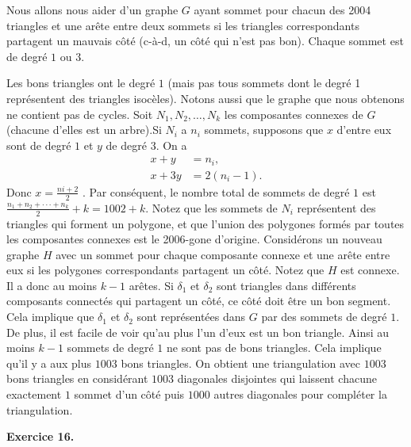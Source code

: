  
\begin{sol}

Nous allons nous aider d’un graphe $G$ ayant sommet pour chacun des 2004 triangles et une arête entre deux sommets si les triangles correspondants partagent un mauvais côté (c-à-d, un côté qui n’est pas bon). 
Chaque sommet est de degré $1$ ou $3$. 

Les bons triangles ont le degré $1$ (mais pas tous sommets dont le degré 1 représentent des triangles isocèles). Notons aussi que le graphe que nous obtenons ne contient pas de cycles.
Soit $N_1,N_2,\ldots, N_k$ les composantes connexes de $G$ (chacune d'elles est un arbre).Si $N_i $ a $n_i$ sommets, supposons que $x$ d’entre eux sont de degré $1$ et $y$ de degré $3$.
On a 
\begin{align*}
x +y &= n_i ,\\
x +3y &= 2(n_i - 1).
\end{align*}
Donc $x = \frac{ni+2 }{2}$ . Par conséquent, le nombre total de sommets de degré $1$ est $\frac{n_1+n_2+···+n_k}{2}+ k = 1002 + k$. Notez que les sommets de $N_i$ représentent des triangles qui forment un polygone,
et que l'union des polygones formés par toutes les composantes connexes est le 2006-gone d’origine. Considérons un nouveau graphe $H $ avec un sommet pour chaque composante connexe et une arête entre eux si les polygones correspondants partagent un côté. Notez que $H $ est connexe. Il a donc au moins $k - 1$ arêtes. Si $\delta_1$ et $\delta_2$ sont triangles dans différents composants connectés qui partagent un côté, ce côté doit être un bon segment. Cela implique que $\delta_1$ et $\delta_2$ sont représentées dans $G$ par des sommets de degré $1$. De plus, il est facile de voir qu'au plus l'un d'eux est un bon triangle. Ainsi au moins $k - 1$ sommets de degré $1$ ne sont pas de bons triangles. Cela implique qu'il y a aux plus $1003$ bons triangles. On obtient une triangulation avec $1003$ bons triangles en considérant $1003$ diagonales disjointes qui laissent chacune exactement $1$ sommet d'un côté puis $1000$ autres diagonales pour compléter la triangulation.\\

\end{sol}

{\bf Exercice 16.} 

